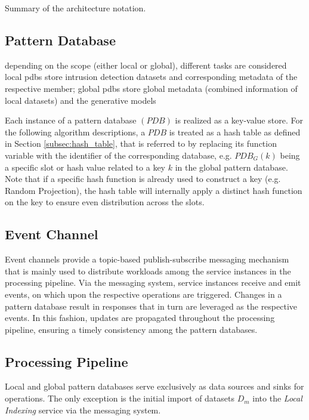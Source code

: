     \begin{table}[b]
        \centering
        
        \caption{Summary of the architecture notation.}
    \end{table}

\subsection{Pattern Database} \label{subsec:pattern_database}

depending on the scope (either local or global), different tasks are considered
local pdbs store intrusion detection datasets and corresponding metadata of the respective member; 
global pdbs store global metadata (combined information of local datasets) and the generative models


Each instance of a pattern database $(PDB)$ is realized as a key-value store. For the following algorithm descriptions, a $PDB$ is treated as a hash table as defined in Section \ref{subsec:hash_table}, that is referred to by replacing its function variable with the identifier of the corresponding database, e.g. $PDB_G(k)$ being a specific slot or hash value related to a key $k$ in the global pattern database. Note that if a specific hash function is already used to construct a key (e.g. Random Projection), the hash table will internally apply a distinct hash function on the key to ensure even distribution across the slots.

\subsection{Event Channel} \label{subsec:event_channel}
Event channels provide a topic-based publish-subscribe messaging mechanism that is mainly used to distribute workloads among the service instances in the processing pipeline. Via the messaging system, service instances receive and emit events, on which upon the respective operations are triggered. Changes in a pattern database result in responses that in turn are leveraged as the respective events. In this fashion, updates are propagated throughout the processing pipeline, ensuring a timely consistency among the pattern databases.

\subsection{Processing Pipeline} \label{subsec:processing_pipeline} 
Local and global pattern databases serve exclusively as data sources and sinks for operations. The only exception is the initial import of datasets $D_m$ into the \textit{Local Indexing} service via the messaging system.



